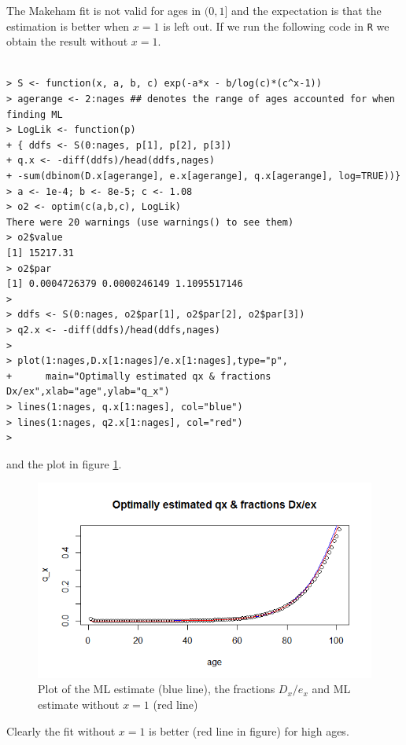 The Makeham fit is not valid for ages in $(0,1]$ and the expectation is that the estimation is better when $x=1$ is left out. If we run the following code in \verb|R| we obtain the result without $x=1$.
\begin{verbatim}

> S <- function(x, a, b, c) exp(-a*x - b/log(c)*(c^x-1))
> agerange <- 2:nages ## denotes the range of ages accounted for when finding ML
> LogLik <- function(p)
+ { ddfs <- S(0:nages, p[1], p[2], p[3])
+ q.x <- -diff(ddfs)/head(ddfs,nages)
+ -sum(dbinom(D.x[agerange], e.x[agerange], q.x[agerange], log=TRUE))}
> a <- 1e-4; b <- 8e-5; c <- 1.08
> o2 <- optim(c(a,b,c), LogLik) 
There were 20 warnings (use warnings() to see them)
> o2$value
[1] 15217.31
> o2$par
[1] 0.0004726379 0.0000246149 1.1095517146
> 
> ddfs <- S(0:nages, o2$par[1], o2$par[2], o2$par[3])
> q2.x <- -diff(ddfs)/head(ddfs,nages)
> 
> plot(1:nages,D.x[1:nages]/e.x[1:nages],type="p",
+      main="Optimally estimated qx & fractions Dx/ex",xlab="age",ylab="q_x")
> lines(1:nages, q.x[1:nages], col="blue")
> lines(1:nages, q2.x[1:nages], col="red")
>
\end{verbatim}

and the plot in figure \ref{Figure_Question9_2}.

\begin{center}
\begin{figure}

\includegraphics[scale=1]{Question_9_MakehamGompertz_2.png}

\caption{Plot of the ML estimate (blue line), the fractions $D_x/e_x$ and ML estimate without $x=1$ (red line)}
\label{Figure_Question9_2}

\end{figure}
\end{center}
Clearly the fit without $x=1$ is better (red line in figure) for high ages.


